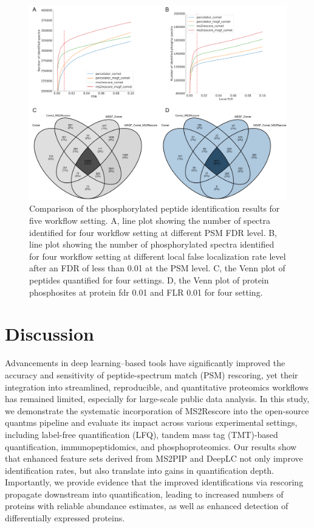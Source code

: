 \documentclass[12pt]{article}
\begin{document}
\begin{figure}[h!]
	\centering
	\includegraphics[width=1\textwidth]{figures//phospho2.png}
	\caption{Comparison of the phosphorylated peptide identification results for five workflow setting. A, line plot showing the number of spectra identified for four workflow setting at different PSM FDR level. B, line plot showing the number of phosphorylated spectra identified for four workflow setting at different local false localization rate level after an FDR of less than 0.01 at the PSM level. C, the Venn plot of peptides quantified for four settings. D, the Venn plot of protein phosphosites at protein fdr 0.01 and FLR 0.01 for four setting.}
	\label{fig:PXD026824_ms2rescore}
\end{figure}


\section{Discussion}
Advancements in deep learning–based tools have significantly improved the accuracy and sensitivity of peptide-spectrum match (PSM) rescoring, yet their integration into streamlined, reproducible, and quantitative proteomics workflows has remained limited, especially for large-scale public data analysis. In this study, we demonstrate the systematic incorporation of MS2Rescore into the open-source quantms pipeline and evaluate its impact across various experimental settings, including label-free quantification (LFQ), tandem mass tag (TMT)-based quantification, immunopeptidomics, and phosphoproteomics. Our results show that enhanced feature sets derived from MS2PIP and DeepLC not only improve identification rates, but also translate into gains in quantification depth. Importantly, we provide evidence that the improved identifications via rescoring propagate downstream into quantification, leading to increased numbers of proteins with reliable abundance estimates, as well as enhanced detection of differentially expressed proteins.
\end{document}
